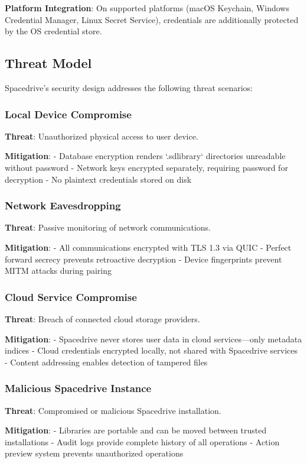 \documentclass[sigconf]{acmart}
\begin{document}
\textbf{Platform Integration}: On supported platforms (macOS Keychain, Windows Credential Manager, Linux Secret Service), credentials are additionally protected by the OS credential store.

\subsection{Threat Model}
Spacedrive's security design addresses the following threat scenarios:

\subsubsection{Local Device Compromise}
\textbf{Threat}: Unauthorized physical access to user device.

\textbf{Mitigation}:
- Database encryption renders `.sdlibrary` directories unreadable without password
- Network keys encrypted separately, requiring password for decryption
- No plaintext credentials stored on disk

\subsubsection{Network Eavesdropping}
\textbf{Threat}: Passive monitoring of network communications.

\textbf{Mitigation}:
- All communications encrypted with TLS 1.3 via QUIC
- Perfect forward secrecy prevents retroactive decryption
- Device fingerprints prevent MITM attacks during pairing

\subsubsection{Cloud Service Compromise}
\textbf{Threat}: Breach of connected cloud storage providers.

\textbf{Mitigation}:
- Spacedrive never stores user data in cloud services---only metadata indices
- Cloud credentials encrypted locally, not shared with Spacedrive services
- Content addressing enables detection of tampered files

\subsubsection{Malicious Spacedrive Instance}
\textbf{Threat}: Compromised or malicious Spacedrive installation.

\textbf{Mitigation}:
- Libraries are portable and can be moved between trusted installations
- Audit logs provide complete history of all operations
- Action preview system prevents unauthorized operations
\end{document}
